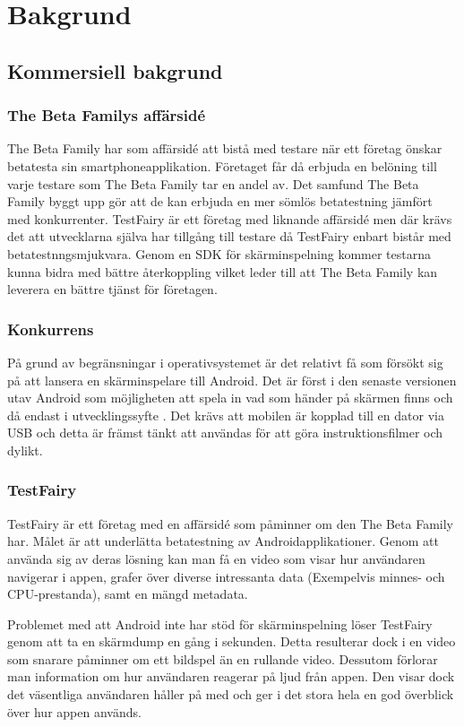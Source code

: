 \section{Bakgrund}
\subsection{Kommersiell bakgrund}
\label{subsec:commercial}
\subsubsection{The Beta Familys affärsidé}
The Beta Family har som affärsidé att bistå med testare när ett företag önskar betatesta sin smartphoneapplikation. Företaget får då erbjuda en belöning till varje testare som The Beta Family tar en andel av. Det samfund The Beta Family byggt upp gör att de kan erbjuda en mer sömlös betatestning jämfört med konkurrenter. TestFairy är ett företag med liknande affärsidé men där krävs det att utvecklarna själva har tillgång till testare då TestFairy enbart bistår med betatestnngsmjukvara. Genom en SDK för skärminspelning kommer testarna kunna bidra med bättre återkoppling vilket leder till att The Beta Family kan leverera en bättre tjänst för företagen.

\subsubsection{Konkurrens}
På grund av begränsningar i operativsystemet är det relativt få som försökt sig på att lansera en skärminspelare till Android. Det är först i den senaste versionen utav Android som möjligheten att spela in vad som händer på skärmen finns och då endast i utvecklingssyfte \parencite{kitkat}. Det krävs att mobilen är kopplad till en dator via USB och detta är främst tänkt att användas för att göra instruktionsfilmer och dylikt.

\subsubsection{TestFairy}
\label{testfairy}
TestFairy är ett företag med en affärsidé som påminner om den The Beta Family har. Målet är att underlätta betatestning av Androidapplikationer. Genom att använda sig av deras lösning kan man få en video som visar hur användaren navigerar i appen, grafer över diverse intressanta data (Exempelvis minnes- och CPU-prestanda), samt en mängd metadata.

Problemet med att Android inte har stöd för skärminspelning löser TestFairy genom att ta en skärmdump en gång i sekunden. Detta resulterar dock i en video som snarare påminner om ett bildspel än en rullande video. Dessutom förlorar man information om hur användaren reagerar på ljud från appen. Den visar dock det väsentliga användaren håller på med och ger i det stora hela en god överblick över hur appen används.

